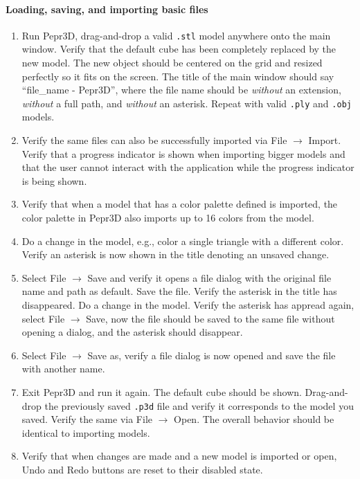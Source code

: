 \paragraph{Loading, saving, and importing basic files}

\begin{enumerate}
\item Run Pepr3D, drag-and-drop a valid \texttt{.stl} model anywhere onto the main window. Verify that the default cube has been completely replaced by the new model. The new object should be centered on the grid and resized perfectly so it fits on the screen. The title of the main window should say ``file\_name - Pepr3D'', where the file name should be \emph{without} an extension, \emph{without} a full path, and \emph{without} an asterisk. Repeat with valid \texttt{.ply} and \texttt{.obj} models.
\item Verify the same files can also be successfully imported via File $\rightarrow$ Import. Verify that a progress indicator is shown when importing bigger models and that the user cannot interact with the application while the progress indicator is being shown.
\item Verify that when a model that has a color palette defined is imported, the color palette in Pepr3D also imports up to 16 colors from the model.
\item Do a change in the model, e.g., color a single triangle with a different color. Verify an asterisk is now shown in the title denoting an unsaved change.
\item Select File $\rightarrow$ Save and verify it opens a file dialog with the original file name and path as default. Save the file. Verify the asterisk in the title has disappeared. Do a change in the model. Verify the asterisk has appread again, select File $\rightarrow$ Save, now the file should be saved to the same file without opening a dialog, and the asterisk should disappear.
\item Select File $\rightarrow$ Save as, verify a file dialog is now opened and save the file with another name.
\item Exit Pepr3D and run it again. The default cube should be shown. Drag-and-drop the previously saved \texttt{.p3d} file and verify it corresponds to the model you saved. Verify the same via File $\rightarrow$ Open. The overall behavior should be identical to importing models.
\item Verify that when changes are made and a new model is imported or open, Undo and Redo buttons are reset to their disabled state.
\end{enumerate}

